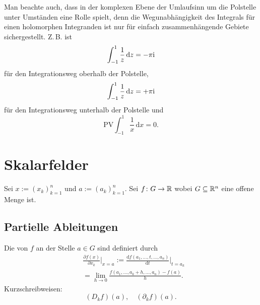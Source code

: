 Man beachte auch, dass in der komplexen Ebene der Umlaufsinn um
die Polstelle unter Umständen eine Rolle spielt, denn die
Wegunabhängigkeit des Integrals für einen holomorphen Integranden
ist nur für einfach zusammenhängende Gebiete
sichergestellt. Z.\,B. ist
\begin{equation}
\int_{-1}^1 \frac{1}{z}\,\mathrm dz = -\pi\mathrm i
\end{equation}
für den Integrationsweg oberhalb der Polstelle,
\begin{equation}
\int_{-1}^1 \frac{1}{z}\,\mathrm dz = +\pi\mathrm i
\end{equation}
für den Integrationsweg unterhalb der Polstelle und
\begin{equation}
\mathrm{PV}\int_{-1}^1 \frac{1}{x}\,\mathrm dx = 0.
\end{equation}

\clearpage
\section{Skalarfelder}
Sei $x:=(x_k)_{k=1}^n$ und $a:=(a_k)_{k=1}^n$. Sei $f\colon G\to\mathbb R$
wobei $G\subseteq\mathbb R^n$ eine offene Menge ist.
\subsection{Partielle Ableitungen}
\begin{definition}\mbox{}\newline
Die 
von $f$ an der Stelle $a\in G$ sind definiert durch
\begin{equation}
\begin{split}
&\frac{\partial f(x)}{\partial x_k}\bigg|_{x=a}
:= \frac{\mathrm df(a_1,\ldots,t,\ldots,a_n)}{\mathrm dt}\bigg|_{t=a_k}\\
&= \lim_{h\to 0}\frac{f(a_1,\ldots,a_k+h,\ldots,a_n)-f(a)}{h}.
\end{split}
\end{equation}
Kurzschreibweisen:
\begin{equation}
(D_k f)(a),\quad (\partial_k f)(a).
\end{equation}
\end{definition}
